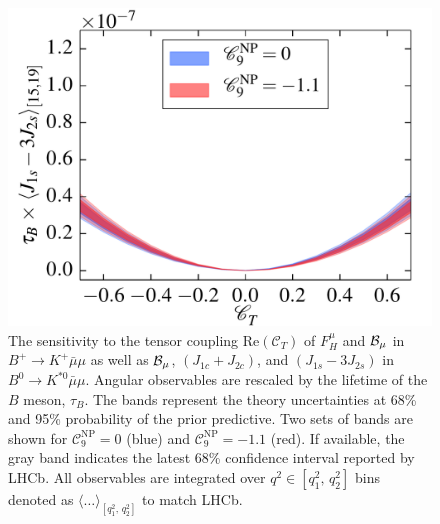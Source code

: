 \documentclass[twocolumn,epjc3]{svjour3}
\numberwithin{equation}{section}
\newcommand{\wilson}[2][{}]{\mathcal{C}_{#2}^{\mathrm{#1}}}
\renewcommand{\[}{\big[}
\renewcommand{\]}{\big]}
\renewcommand{\(}{\big(}
\renewcommand{\)}{\big)}
\newlength{\relwidth}
\begin{document}
\begin{figure}
\begin{center}
    \includegraphics[width=\relwidth]{plots/pdf/ct_Kstar_J_1s_minus_3J_2s15to19}
  \end{center}
  \caption{ The sensitivity to the tensor coupling
    $\mbox{Re}(\wilson{T})$ of $F_H^\mu$ and {${\cal B}_\mu$} in $B^+
    \to K^+ \bar\mu\mu$ {as well as} {${\cal B}_\mu$}, $(J_{1c} +
    J_{2c})$, and $(J_{1s}-3 J_{2s})$ in $B^0 \to K^{*0}
    \bar\mu\mu$. Angular observables are rescaled by the lifetime of
    the $B$ meson, $\tau_B$. The bands represent the theory
    uncertainties at 68\% and 95\% probability of the prior
    predictive.  Two sets of bands are shown for $\wilson[NP]{9} = 0$
    (blue) and $\wilson[NP]{9} = -1.1$ (red). If available, the gray
    band indicates the latest 68\% confidence interval reported by
    LHCb. All observables are integrated over $q^2 \in
    [q_1^2,\,q_2^2]$ bins denoted as $\langle \dots \rangle_{[q^2_1,\,
      q^2_2]}$ to match LHCb. }
  \label{fig:FHvsCT}
\end{figure}
\end{document}
